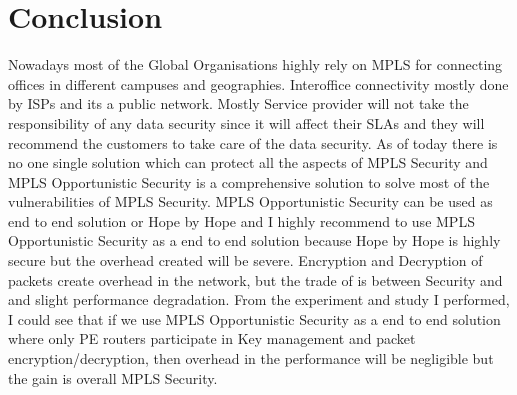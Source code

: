 \chapter{Conclusion}


Nowadays most of the Global Organisations highly rely on MPLS for connecting offices in different campuses and geographies. Interoffice connectivity mostly done by ISPs and its a public network. Mostly Service provider will not take the responsibility of any data security since it will affect their SLAs and they will recommend the customers to take care of the data security. As of today there is no one single solution which can protect all the aspects of MPLS Security and MPLS Opportunistic Security is a comprehensive solution to solve most of the vulnerabilities of MPLS Security. MPLS Opportunistic Security can be used as end to end solution or Hope by Hope and I highly recommend to use MPLS Opportunistic Security as a end to end solution because Hope by Hope is highly secure but the overhead created will be severe. Encryption and Decryption of packets create overhead in the network, but the trade of is between Security and and slight performance degradation. From the experiment and study I performed, I could see that if we use MPLS Opportunistic Security as a end to end solution where only PE routers participate in Key management and packet encryption/decryption, then overhead in the performance will be negligible but the gain is overall MPLS Security\cite{smith01}. 



